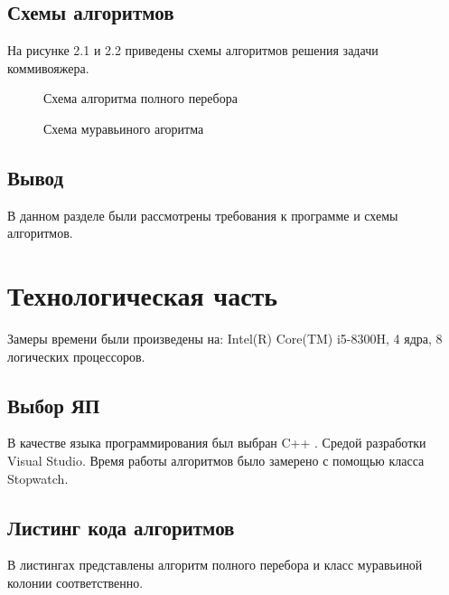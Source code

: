 \documentclass[12pt]{report}
\begin{document}
\section{Схемы алгоритмов}
На рисунке 2.1 и 2.2 приведены схемы алгоритмов решения задачи коммивояжера.\\

\newpage
\begin{figure}[h]
        	\caption{Схема алгоритма полного перебора}
        	\label{fig:f_p}
\end{figure}
        \newpage   

\begin{figure}[h]
        	\caption{Схема муравьиного агоритма}
        	\label{fig:ant}
\end{figure}
\newpage

\section*{Вывод}
В данном разделе были рассмотрены требования к программе и схемы алгоритмов.


 

\chapter{Технологическая часть}
Замеры времени были произведены на: Intel(R) Core(TM) i5-8300H, 4 ядра, 8 логических процессоров.

\section{Выбор ЯП}
В качестве языка программирования был выбран C++ \cite{Microsoft}. Средой разработки Visual Studio. 
Время работы алгоритмов было замерено с помощью класса Stopwatch. 

\section{Листинг кода алгоритмов}
В листингах представлены алгоритм полного перебора и класс муравьиной колонии соответственно.
\end{document}
